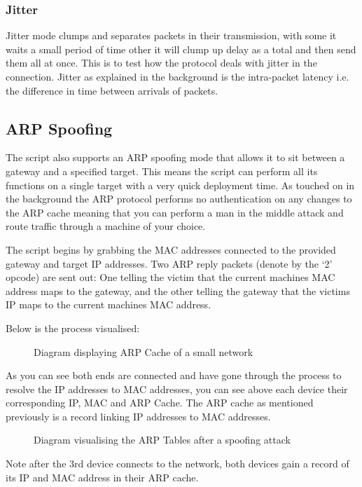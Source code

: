 \subsubsection{Jitter}
Jitter mode clumps and separates packets in their transmission, with some it waits a small period of time other it will clump up delay as a total and then send them all at once. This is to test how the protocol deals with jitter in the connection. Jitter as explained in the background is the intra-packet latency i.e. the difference in time between arrivals of packets.

\subsection{ARP Spoofing}
The script also supports an ARP spoofing mode that allows it to sit between a gateway and a specified target. This means the script can perform all its functions on a single target with a very quick deployment time. As touched on in the background the ARP protocol performs no authentication on any changes to the ARP cache meaning that you can perform a man in the middle attack and route traffic through a machine of your choice.

The script begins by grabbing the MAC addresses connected to the provided gateway and target IP addresses. Two ARP reply packets (denote by the `2' opcode) are sent out: One telling the victim that the current machines MAC address maps to the gateway, and the other telling the gateway that the victims IP maps to the current machines MAC address.

Below is the process visualised:


\begin{figure}[h]
	\caption{Diagram displaying ARP Cache of a small network}
\end{figure}

As you can see both ends are connected and have gone through the process to resolve the IP addresses to MAC addresses, you can see above each device their corresponding IP, MAC and ARP Cache. The ARP cache as mentioned previously is a record linking IP addresses to MAC addresses.


\begin{figure}[h]
	\caption{Diagram visualising the ARP Tables after a spoofing attack}
\end{figure}

Note after the 3rd device connects to the network, both devices gain a record of its IP and MAC address in their ARP cache. 

